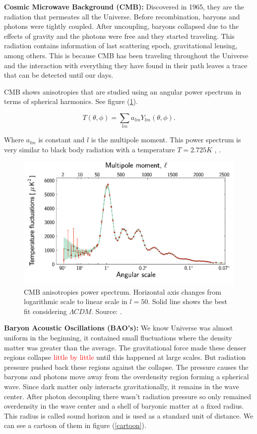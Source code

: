 \documentclass[onecolumn,           %
               showpacs,            %
               preprintnumbers,     %
               aps,                 %
               prl,          	    %
               letterpaper,             %
               superscriptaddress,      %
               nofootinbib,         %
               tightenlines,        %
               floats,floatfix      %
               ,usenatbib,
               ]{revtex4-1}
\begin{document}
\textbf{Cosmic Microwave Background (CMB):} Discovered in 1965, they are the radiation that permeates all the Universe. Before recombination, baryons and photons were tightly coupled. After uncoupling, baryons collapsed due to the effects of gravity and the photons were free and they started traveling. This radiation contains information of last scattering epoch, gravitational lensing, among others. This is because CMB has been traveling throughout the Universe and the interaction with everything they have found in their path leaves a trace that can be detected until our days.

CMB shows anisotropies that are studied using an angular power spectrum in terms of spherical harmonics. See figure (\ref{CMBgraf}).

\begin{equation}
T(\theta, \phi) = \sum_{lm} a_{lm} Y_{lm} \left(\theta, \phi \right) .
\end{equation}

Where $a_{lm}$ is constant and $l$ is the multipole moment. This power spectrum is very similar to black body radiation with a temperature $T = 2.725K$ \cite{CMB1}, \cite{CMB2}.

\begin{figure}[h]
	\centering
	\includegraphics[width=12cm]{FiguresCosmo/espectro_temperatura_CMB.png}	
	\caption{CMB anisotropies power spectrum. Horizontal axis changes from logarithmic scale to linear scale in $l = 50$. Solid line shows the best fit considering $\Lambda CDM$. Source: \cite{parametros}.}
	\label{CMBgraf} 
\end{figure}

\textbf{Baryon Acoustic Oscillations (BAO's):} We know Universe was almost uniform in the beginning, it contained small fluctuations where the density matter was greater than the average. The gravitational force made these denser regions collapse \textcolor{red}{little by little} until this happened at large scales. But radiation pressure pushed back these regions against the collapse. The pressure causes the baryons and photons move away from the overdensity region forming a spherical wave. Since dark matter only interacts gravitationally, it remains in the wave center. After photon decoupling there wasn't radiation pressure so only remained overdensity in the wave center and a shell of baryonic matter at a fixed radius. This radius is called sound horizon and is used as a standard unit of distance. We can see a cartoon of them in figure (\ref{cartoon}).
\end{document}
